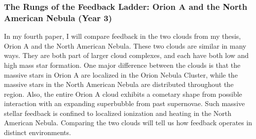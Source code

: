 \subsubsection{The Rungs of the Feedback Ladder: Orion A and the North American Nebula (Year 3)}\label{sec:paper4}
        In my fourth paper, I will compare feedback in the two clouds from my thesis, Orion A and the North American Nebula. These two clouds are similar in many ways. They are both part of larger cloud complexes, and each have both low and high mass star formation. One major difference between the clouds is that the massive stars in Orion A are localized in the Orion Nebula Cluster, while the massive stars in the North American Nebula are distributed throughout the region. Also, the entire Orion A cloud exhibits a cometary shape from possible interaction with an expanding superbubble from past supernovae. Such massive stellar feedback is confined to localized ionization and heating in the North American Nebula. Comparing the two clouds will tell us how feedback operates in distinct environments.